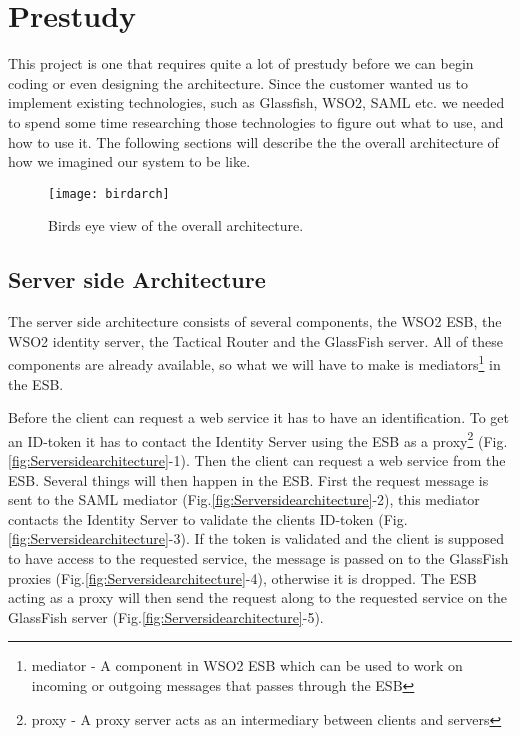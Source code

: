 \section{Prestudy}\label{Prestudy} This project is one that requires quite a lot of prestudy before we can begin coding or even designing the architecture. Since the customer wanted us to implement existing technologies, such as Glassfish, WSO2, SAML etc. we needed to spend some time researching those technologies to figure out what to use, and how to use it. The following sections will describe the the overall architecture of how we imagined our system to be like. 

        \begin{figure}[htb]
            \centering
            \texttt{[image: birdarch]}
            \caption{Birds eye view of the overall architecture.}
            \label{fig:birdarch}
        \end{figure}

    \subsection{Server side Architecture}\label{Server side Architecture}
    
        The server side architecture consists of several components, the WSO2 ESB, the WSO2 \gls{identity server}, the Tactical Router and the GlassFish server. All of these components are already available, so what we will have to make is \glspl{mediator}\footnote{\Gls{mediator} - A component in WSO2 ESB which can be used to work on incoming or outgoing messages that passes through the ESB} in the ESB.

        Before the client can request a web service it has to have an identification. To get an ID-\gls{token} it has to contact the Identity Server using the ESB as a \gls{proxy}\footnote{\Gls{proxy} - A proxy server acts as an intermediary between clients and servers} (Fig.\ref{fig:Serversidearchitecture}-1). Then the client can request a web service from the ESB. Several things will then happen in the ESB. First the request message is sent to the SAML mediator (Fig.\ref{fig:Serversidearchitecture}-2), this mediator contacts the Identity Server to validate the clients ID-token (Fig.\ref{fig:Serversidearchitecture}-3). If the token is validated and the client is supposed to have access to the requested service, the message is passed on to the GlassFish proxies (Fig.\ref{fig:Serversidearchitecture}-4), otherwise it is dropped. The ESB acting as a proxy will then send the request along to the requested service on the GlassFish server (Fig.\ref{fig:Serversidearchitecture}-5).

